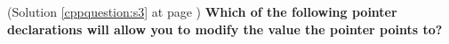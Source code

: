 \begin{cppquestion}
    \label{cppquestion:q3}
    (Solution \ref{cppquestion:s3} at page \pageref{cppquestion:s3})
    \question \textbf{Which of the following pointer declarations will allow you to modify the value the pointer points to?} 
    
    \begin{choices}
     \choice {}
     \choice {}
     \choice {}
     \choice {}
     \choice {}
     \choice {}
    \end{choices}
\end{cppquestion}

